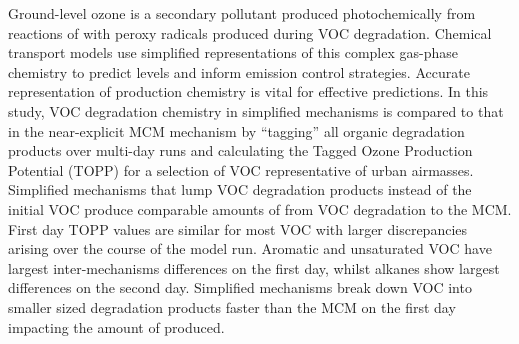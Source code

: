 Ground-level ozone is a secondary pollutant produced photochemically from reactions of  with peroxy radicals produced during VOC degradation. 
Chemical transport models use simplified representations of this complex gas-phase chemistry to predict  levels and inform emission control strategies. 
Accurate representation of  production chemistry is vital for effective predictions.
In this study, VOC degradation chemistry in simplified mechanisms is compared to that in the near-explicit MCM mechanism by ``tagging'' all organic degradation products over multi-day runs and calculating the Tagged Ozone Production Potential (TOPP) for a selection of VOC representative of urban airmasses.
Simplified mechanisms that lump VOC degradation products instead of the initial VOC produce comparable amounts of  from VOC degradation to the MCM.
First day TOPP values are similar for most VOC with larger discrepancies arising over the course of the model run.
Aromatic and unsaturated VOC have largest inter-mechanisms differences on the first day, whilst alkanes show largest differences on the second day.
Simplified mechanisms break down VOC into smaller sized degradation products faster than the MCM on the first day impacting the amount of  produced.
